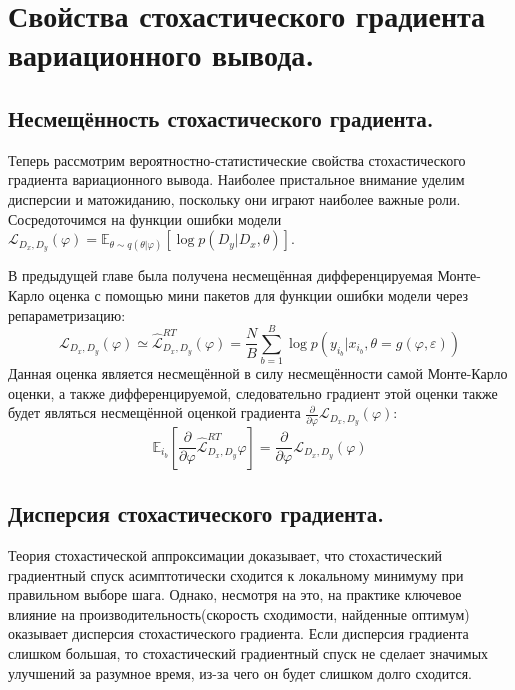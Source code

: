 \section{Свойства стохастического градиента вариационного вывода.}
\subsection{Несмещённость стохастического градиента.}

Теперь рассмотрим вероятностно-статистические свойства стохастического градиента вариационного вывода\cite{localRT}.
 Наиболее пристальное внимание уделим дисперсии и матожиданию, поскольку они играют наиболее важные роли.
 Сосредоточимся на функции ошибки модели $\mathcal{L}_{D_x, D_y}(\varphi) = \mathbb{E}_{\theta \sim q(\theta | \varphi)}[\log p(D_y | D_x, \theta)]$.

В предыдущей главе была получена несмещённая дифференцируемая Монте-Карло оценка с помощью мини пакетов для функции ошибки модели через репараметризацию:
$$\mathcal{L}_{D_x, D_y}(\varphi) \simeq \widehat{\mathcal{L}}_{D_x, D_y}^{RT}(\varphi) = \frac{N}{B}\sum_{b=1}^B \log p(y_{i_b} | x_{i_b}, \theta=g(\varphi, \varepsilon))$$
Данная оценка является несмещённой в силу несмещённости самой Монте-Карло оценки, а также дифференцируемой, следовательно
 градиент этой оценки также будет являться несмещённой оценкой градиента $\frac{\partial}{\partial \varphi} \mathcal{L}_{D_x, D_y}(\varphi)$:
$$\mathbb{E}_{i_b}[\frac{\partial}{\partial \varphi}\widehat{\mathcal{L}}_{D_x, D_y}^{RT}{\varphi}] = \frac{\partial}{\partial \varphi} \mathcal{L}_{D_x, D_y}(\varphi)$$

\subsection{Дисперсия стохастического градиента.} \label{SGvariance}

Теория стохастической аппроксимации доказывает, что стохастический градиентный спуск асимптотически сходится к локальному минимуму
 при правильном выборе шага. Однако, несмотря на это, на практике ключевое влияние на производительность(скорость сходимости, найденные оптимум)
 оказывает дисперсия стохастического градиента. Если дисперсия градиента слишком большая, то стохастический градиентный спуск не сделает значимых улучшений
 за разумное время, из-за чего он будет слишком долго сходится.

